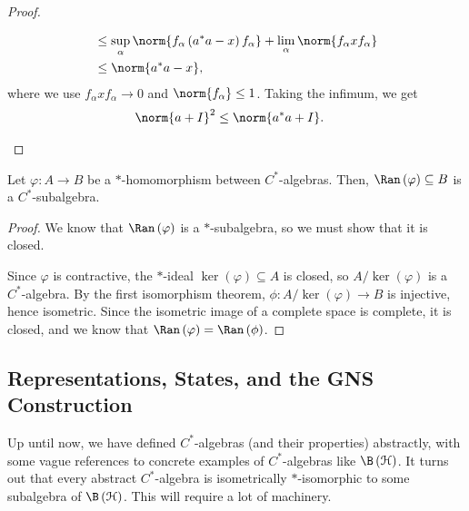 \documentclass[10pt]{mypackage}
\begin{document}
\begin{proof}
\begin{enumerate}[(1)]
\begin{align*}
                     &\leq \sup_{\alpha}\norm{f_{\alpha}\left(a^{\ast}a-x\right)f_{\alpha}} + \lim_{\alpha}\norm{f_{\alpha}xf_{\alpha}}\\
                     &\leq \norm{a^{\ast}a-x},
      \end{align*}
      where we use $f_{\alpha}xf_{\alpha}\rightarrow 0$ and $\norm{f_{\alpha}}\leq 1$. Taking the infimum, we get
      \begin{align*}
        \norm{a+I}^2 &\leq \norm{a^{\ast}a + I}.
      \end{align*}
  \end{enumerate}
\end{proof}
\begin{corollary}
  Let $\varphi\colon A\rightarrow B$ be a $\ast$-homomorphism between $C^{\ast}$-algebras. Then, $\Ran\left(\varphi\right)\subseteq B$ is a $C^{\ast}$-subalgebra.
\end{corollary}
\begin{proof}
  We know that $\Ran\left(\varphi\right)$ is a $\ast$-subalgebra, so we must show that it is closed.\newline

  Since $\varphi$ is contractive, the $\ast$-ideal $\ker\left(\varphi\right)\subseteq A$ is closed, so $A/\ker\left(\varphi\right)$ is a $C^{\ast}$-algebra. By the first isomorphism theorem, $\phi\colon A/ \ker\left(\varphi\right)\rightarrow B$ is injective, hence isometric. Since the isometric image of a complete space is complete, it is closed, and we know that $\Ran\left(\varphi\right) = \Ran\left(\phi\right)$.
\end{proof}
\subsection{Representations, States, and the GNS Construction}%
Up until now, we have defined $C^{\ast}$-algebras (and their properties) abstractly, with some vague references to concrete examples of $C^{\ast}$-algebras like $\B\left(\mathcal{H}\right)$. It turns out that every abstract $C^{\ast}$-algebra is isometrically $\ast$-isomorphic to some subalgebra of $\B\left(\mathcal{H}\right)$. This will require a lot of machinery.\newline
\end{document}
